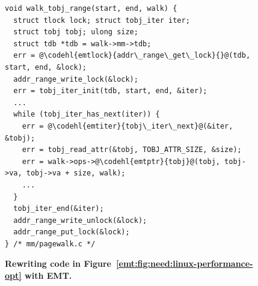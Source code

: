 
\begin{figure}[tbp]
	\centering
\begin{verbatim}
void walk_tobj_range(start, end, walk) {
  struct tlock lock; struct tobj_iter iter;
  struct tobj tobj; ulong size; 
  struct tdb *tdb = walk->mm->tdb;
  err = @\codehl{emtlock}{addr\_range\_get\_lock}{}@(tdb, start, end, &lock);
  addr_range_write_lock(&lock);
  err = tobj_iter_init(tdb, start, end, &iter);
  ...
  while (tobj_iter_has_next(iter)) {
    err = @\codehl{emtiter}{tobj\_iter\_next}@(&iter, &tobj);
    err = tobj_read_attr(&tobj, TOBJ_ATTR_SIZE, &size);
    err = walk->ops->@\codehl{emtptr}{tobj}@(tobj, tobj->va, tobj->va + size, walk);
    ...
  }
  tobj_iter_end(&iter);
  addr_range_write_unlock(&lock);
  addr_range_put_lock(&lock);
} /* mm/pagewalk.c */
\end{verbatim}


\caption{\bf Rewriting code in Figure~\ref{emt:fig:need:linux-performance-opt} with EMT.}
\label{emt:fig:interface-compare}
\end{figure}

